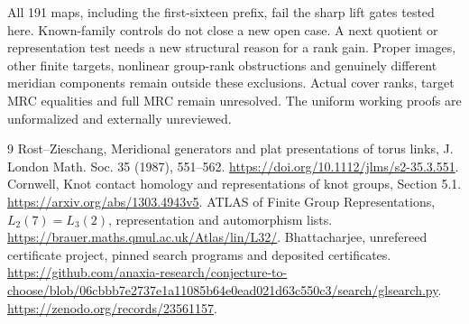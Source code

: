 \documentclass[11pt]{article}
\begin{document}
All 191 maps, including the first-sixteen prefix, fail the sharp
lift gates tested here. Known-family controls do not close a new
open case. A next quotient or representation test needs a new
structural reason for a rank gain. Proper images, other finite
targets, nonlinear group-rank obstructions and genuinely different
meridian components remain outside these exclusions. Actual cover
ranks, target MRC equalities and full MRC remain unresolved.
The uniform working proofs are unformalized and externally
unreviewed.

\begin{thebibliography}{9}
 Rost--Zieschang, Meridional generators and plat
presentations of torus links, J. London Math. Soc. 35 (1987),
551--562. \url{https://doi.org/10.1112/jlms/s2-35.3.551}.
 Cornwell, Knot contact homology and representations
of knot groups, Section 5.1.
\url{https://arxiv.org/abs/1303.4943v5}.
 ATLAS of Finite Group Representations,
$L_2(7)=L_3(2)$, representation and automorphism lists.
\url{https://brauer.maths.qmul.ac.uk/Atlas/lin/L32/}.
 Bhattacharjee, unrefereed certificate project,
pinned search programs and deposited certificates.
\url{https://github.com/anaxia-research/conjecture-to-choose/blob/06cbbb7e2737e1a11085b64e0ead021d63c550c3/search/glsearch.py}.
\url{https://zenodo.org/records/23561157}.
\end{thebibliography}
\end{document}
